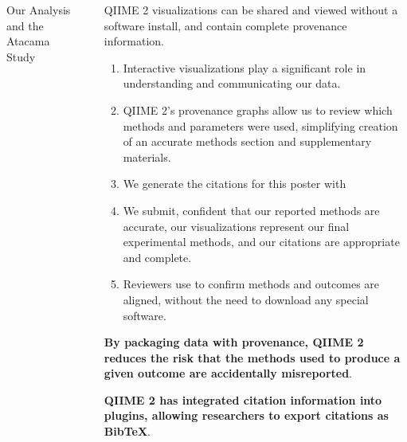 \documentclass[final]{beamer}
\newlength{\sepwidth}
\newlength{\colwidth}
\newcommand{\separatorcolumn}{\begin{column}{\sepwidth}\end{column}}
\begin{document}
\begin{frame}[t]
\begin{columns}[t]
\begin{column}{\colwidth}
\begin{block}{Our Analysis and the Atacama Study}
  \end{block}

\end{column}

\separatorcolumn

\begin{column}{\colwidth}

  \begin{block}{QIIME 2 visualizations can be shared and viewed without a software install, and contain complete provenance information.}

    \begin{enumerate}
      \item Interactive visualizations play a significant role in understanding and
      communicating our data. 
      \item QIIME 2’s provenance graphs allow us to review which methods and
      parameters were used, simplifying creation of an accurate methods section
      and supplementary materials.
      \item We generate the citations for this poster with 
      \item We submit, confident that our reported methods are accurate, our
      visualizations represent our final experimental methods, and our
      citations are appropriate and complete.
      \item Reviewers use  to confirm methods and outcomes are
      aligned, without the need to download any special software.
    \end{enumerate}

    \textbf{By packaging data with provenance, QIIME 2 reduces the risk that the
      methods used to produce a given outcome are accidentally misreported}.

    \textbf{QIIME 2 has integrated citation information into plugins, allowing
    researchers to export citations as BibTeX}.


\end{block}
\end{column}
\end{columns}
\end{frame}
\end{document}
